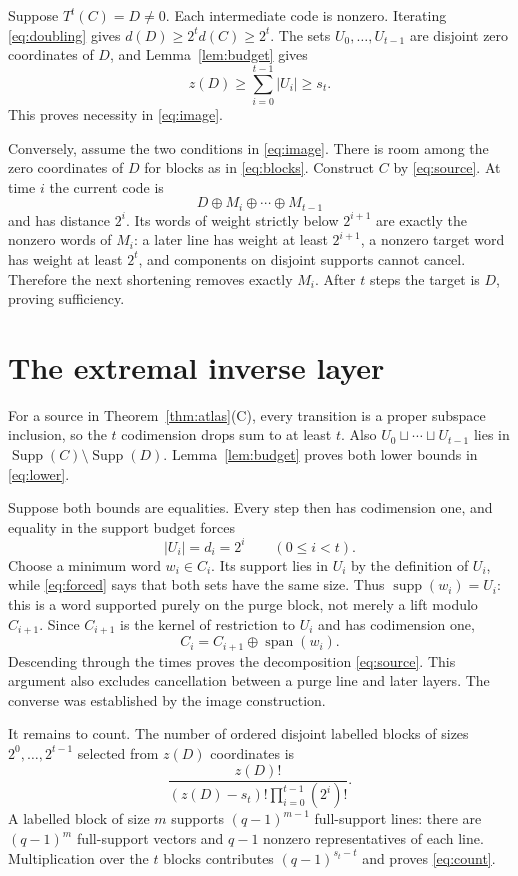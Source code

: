 \documentclass[a4paper,10pt]{amsart}
\theoremstyle{remark}
\newcommand{\supp}{\operatorname{supp}}
\newcommand{\Supp}{\operatorname{Supp}}
\newcommand{\Span}{\operatorname{span}}
\begin{document}
Suppose $T^t(C)=D\ne0$.  Each intermediate code is nonzero.  Iterating
\eqref{eq:doubling} gives $d(D)\geq2^td(C)\geq2^t$.  The sets
$U_0,\ldots,U_{t-1}$ are disjoint zero coordinates of $D$, and
Lemma~\ref{lem:budget} gives
\[
 z(D)\geq\sum_{i=0}^{t-1}|U_i|\geq s_t.
\]
This proves necessity in \eqref{eq:image}.

Conversely, assume the two conditions in \eqref{eq:image}.  There is room
among the zero coordinates of $D$ for blocks as in \eqref{eq:blocks}.
Construct $C$ by \eqref{eq:source}.  At time $i$ the current code is
\[
 D\oplus M_i\oplus\cdots\oplus M_{t-1}
\]
and has distance $2^i$.  Its words of weight strictly below $2^{i+1}$ are
exactly the nonzero words of $M_i$: a later line has weight at least
$2^{i+1}$, a nonzero target word has weight at least $2^t$, and components
on disjoint supports cannot cancel.  Therefore the next shortening removes
exactly $M_i$.  After $t$ steps the target is $D$, proving sufficiency.

\section{The extremal inverse layer}

For a source in Theorem~\ref{thm:atlas}(C), every transition is a proper
subspace inclusion, so the $t$ codimension drops sum to at least $t$.
Also $U_0\sqcup\cdots\sqcup U_{t-1}$ lies in
$\Supp(C)\setminus\Supp(D)$.  Lemma~\ref{lem:budget} proves both lower
bounds in \eqref{eq:lower}.

Suppose both bounds are equalities.  Every step then has codimension one,
and equality in the support budget forces
\begin{equation}\label{eq:forced}
 |U_i|=d_i=2^i\qquad(0\leq i<t).
\end{equation}
Choose a minimum word $w_i\in C_i$.  Its support lies in $U_i$ by the
definition of $U_i$, while \eqref{eq:forced} says that both sets have the
same size.  Thus $\supp(w_i)=U_i$: this is a word supported purely on the
purge block, not merely a lift modulo $C_{i+1}$.  Since $C_{i+1}$ is the
kernel of restriction to $U_i$ and has codimension one,
\[
 C_i=C_{i+1}\oplus\Span(w_i).
\]
Descending through the times proves the decomposition
\eqref{eq:source}.  This argument also excludes cancellation between a
purge line and later layers.  The converse was established by the image
construction.

It remains to count.  The number of ordered disjoint labelled blocks of
sizes $2^0,\ldots,2^{t-1}$ selected from $z(D)$ coordinates is
\[
 \frac{z(D)!}{(z(D)-s_t)!\prod_{i=0}^{t-1}(2^i)!}.
\]
A labelled block of size $m$ supports $(q-1)^{m-1}$ full-support lines:
there are $(q-1)^m$ full-support vectors and $q-1$ nonzero representatives
of each line.  Multiplication over the $t$ blocks contributes
$(q-1)^{s_t-t}$ and proves \eqref{eq:count}.
\end{document}
